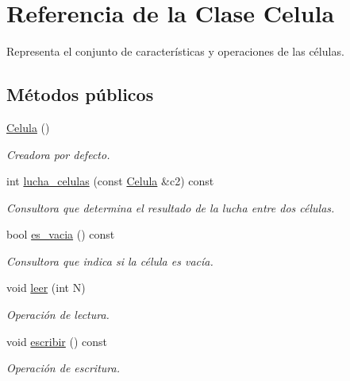 \hypertarget{class_celula}{\section{Referencia de la Clase Celula}
\label{class_celula}
}


Representa el conjunto de características y operaciones de las células.  


\subsection*{Métodos públicos}
\begin{DoxyCompactItemize}
\item 
\hyperlink{class_celula_a3c5017fbcec8cb564acc666aa7e21206}{Celula} ()
\begin{DoxyCompactList}\small\item\em Creadora por defecto. \end{DoxyCompactList}\item 
int \hyperlink{class_celula_a3dd8be98f1548b02696e2fc32b8d19b4}{lucha\+\_\+celulas} (const \hyperlink{class_celula}{Celula} \&c2) const 
\begin{DoxyCompactList}\small\item\em Consultora que determina el resultado de la lucha entre dos células. \end{DoxyCompactList}\item 
bool \hyperlink{class_celula_a4e97c60a207191b2cc951ccdf245df4b}{es\+\_\+vacia} () const 
\begin{DoxyCompactList}\small\item\em Consultora que indica si la célula es vacía. \end{DoxyCompactList}\item 
void \hyperlink{class_celula_a5124ea0c0da24dfc295dcc428652ee43}{leer} (int N)
\begin{DoxyCompactList}\small\item\em Operación de lectura. \end{DoxyCompactList}\item 
void \hyperlink{class_celula_ae16a94d28e49affafd260405414f37ad}{escribir} () const 
\begin{DoxyCompactList}\small\item\em Operación de escritura. \end{DoxyCompactList}\end{DoxyCompactItemize}
